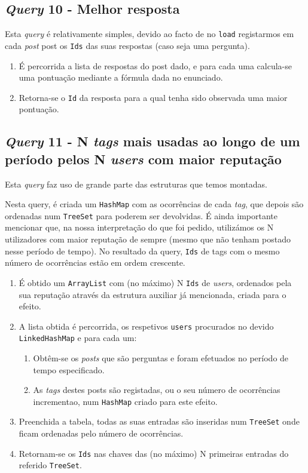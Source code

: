 \documentclass[10pt]{article}
\begin{document}
	\subsection*{\textit{Query} 10 - Melhor resposta}
			Esta \textit{query} é relativamente simples, devido ao 			facto de no \texttt{load} registarmos em cada \textit{post} 
	post os \texttt{Ids} das suas respostas (caso seja uma pergunta).
						
			\begin{enumerate}
				\item É percorrida a lista de respostas do post dado,
			e para cada uma calcula-se uma pontuação mediante a 
			fórmula dada no enunciado.
				\item Retorna-se o \texttt{Id} da resposta para a qual 
			tenha sido observada uma maior pontuação.
			\end{enumerate}
	\subsection*{\textit{Query} 11 - N \textit{tags} mais usadas ao longo de um período pelos N \textit{users} com maior reputação}
			Esta \textit{query} faz uso de grande parte das estruturas que temos montadas.
		
			Nesta query, é criada um \texttt{HashMap} com 
		as ocorrências de cada \textit{tag}, que depois são 
		ordenadas num \texttt{TreeSet} para poderem ser devolvidas.
			É ainda importante mencionar que, na nossa interpretação 
		do que foi pedido, utilizámos os N utilizadores com maior 
		reputação de sempre (mesmo que não tenham postado nesse 
		período de tempo). No resultado da query, \texttt{Ids} de 
		tags com o mesmo número de ocorrências estão em ordem 
		crescente.		
		
			\begin{enumerate}
				\item É obtido um \texttt{ArrayList} com (no máximo) 
			N \texttt{Ids} de \textit{users}, ordenados pela sua 
			reputação através da estrutura auxiliar já mencionada, 
			criada para o efeito.
				\item A lista obtida é percorrida, os respetivos 
			\texttt{users} procurados no devido \texttt{LinkedHashMap} 
			e para cada um:
					\begin{enumerate}
						\item Obtêm-se os \textit{posts} que são 
						perguntas e foram efetuados no período de 
						tempo especificado.
						\item As \textit{tags} destes posts são 
					registadas, ou o seu número de ocorrências 
					incrementao, num \texttt{HashMap} criado para 
					este efeito.
					\end{enumerate}
				\item Preenchida a tabela, todas as suas entradas 
			são inseridas num \texttt{TreeSet} onde ficam 
			ordenadas pelo número de ocorrências.
				\item Retornam-se os \texttt{Ids} nas chaves das (no 
				máximo) N primeiras entradas do referido 
				\texttt{TreeSet}.
			\end{enumerate}
			
\end{document}
